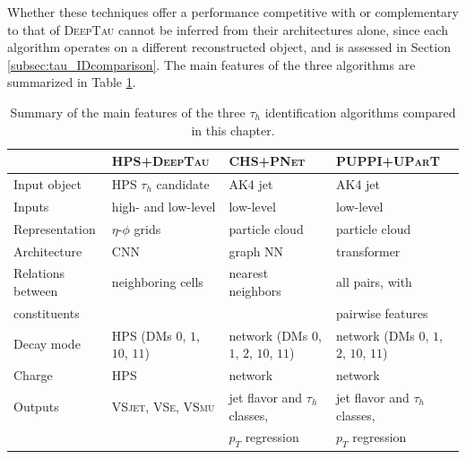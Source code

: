 Whether these techniques offer a performance competitive with or complementary to that of \textsc{DeepTau} cannot be inferred from their architectures alone, since each algorithm operates on a different reconstructed object, and is assessed in Section \ref{subsec:tau_IDcomparison}. The main features of the three algorithms are summarized in Table \ref{tab:algo_comparison}.
%
\begin{table}[h!]
    \centering
    \footnotesize
    \begin{tabular}{l l l l}
    \toprule
     & \textbf{HPS+\textsc{DeepTau}} & \textbf{CHS+\textsc{PNet}} & \textbf{PUPPI+\textsc{UParT}} \\
    \midrule
    Input object      & HPS $\tau_h$ candidate & AK4 jet & AK4 jet \\
    Inputs            & high- and low-level & low-level & low-level \\
    Representation    & $\eta$-$\phi$ grids & particle cloud & particle cloud \\
    Architecture      & CNN & graph NN & transformer \\
    Relations between & neighboring cells & nearest neighbors & all pairs, with \\
    constituents      &                   &                   & pairwise features \\
    Decay mode        & HPS (DMs $0$, $1$, $10$, $11$) & network (DMs $0$, $1$, $2$, $10$, $11$) & network (DMs $0$, $1$, $2$, $10$, $11$) \\
    Charge            & HPS & network & network \\
    Outputs           & \textsc{VSjet}, \textsc{VSe}, \textsc{VSmu} & jet flavor and $\tau_h$ classes, & jet flavor and $\tau_h$ classes, \\
                      &                                             & $p_T$ regression & $p_T$ regression \\
    \bottomrule
    \end{tabular}
    \caption{Summary of the main features of the three $\tau_h$ identification algorithms compared in this chapter.}
    \label{tab:algo_comparison}
\end{table}











